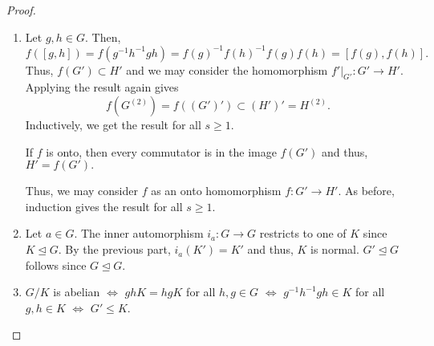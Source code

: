\commutatorresults*\label{prop:commutatorresults2}
\begin{flushright}\hyperref[prop:commutatorresults]{\upsym}\end{flushright}
\begin{proof}
    \phantom{hi}
    \begin{enumerate}
        \item Let $g, h \in G.$ Then, 
        \begin{equation*} 
            f([g, h]) = f(g^{-1}h^{-1}gh) = f(g)^{-1}f(h)^{-1}f(g)f(h) = [f(g), f(h)].
        \end{equation*}
        Thus, $f(G') \subset H'$ and we may consider the homomorphism $f'|_{G'} : G' \to H'.$ Applying the result again gives
        \begin{equation*} 
            f(G^{(2)}) = f((G')') \subset (H')' = H^{(2)}.
        \end{equation*}  
        Inductively, we get the result for all $s \ge 1.$

        If $f$ is onto, then every commutator is in the image $f(G')$ and thus, $H' = f(G').$

        Thus, we may consider $f$ as an onto homomorphism $f : G' \to H'.$ As before, induction gives the result for all $s \ge 1.$
        \item Let $a \in G.$ The inner automorphism $i_a : G \to G$ restricts to one of $K$ since $K \unlhd G.$ By the previous part, $i_a(K') = K'$ and thus, $K$ is normal. $G' \unlhd G$ follows since $G \unlhd G.$
        \item $G/K$ is abelian $\iff$ $ghK = hgK$ for all $h, g \in G$ $\iff$ $g^{-1}h^{-1}gh \in K$ for all $g, h \in K$ $\iff$ $G' \le K.$ \qedhere
    \end{enumerate}
\end{proof}

